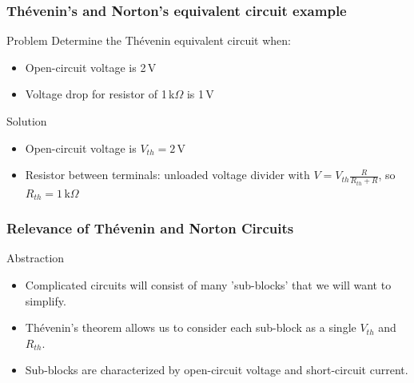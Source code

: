 \documentclass[beamer]{standalone}
\begin{document}
\begin{frame}
 \frametitle{Th\'evenin's and Norton's equivalent circuit example}
 \begin{block}{Problem}
  Determine the Th\'evenin equivalent circuit when:
  \begin{itemize}
   \item Open-circuit voltage is 2\,V
   \item Voltage drop for resistor of 1\,k$\Omega$ is 1\,V
  \end{itemize}
 \end{block}
 \begin{block}{Solution}
  \begin{itemize}
   \item Open-circuit voltage is $V_{th} = 2$\,V
   \item Resistor between terminals: unloaded voltage divider with $V = V_{th} \frac{R}{R_{th} + R}$, so $R_{th} = 1$\,k$\Omega$
  \end{itemize}
 \end{block}
\end{frame}


\begin{frame}
 \frametitle{Relevance of Th\'evenin and Norton Circuits}
 \begin{block}{Abstraction}
  \begin{itemize}
   \item Complicated circuits will consist of many 'sub-blocks' that we will want to simplify.
   \item Th\'evenin's theorem allows us to consider each sub-block as a single $V_{th}$ and $R_{th}$.
   \item Sub-blocks are characterized by open-circuit voltage and short-circuit current.
  \end{itemize}
 \end{block}
\end{frame}
\end{document}
